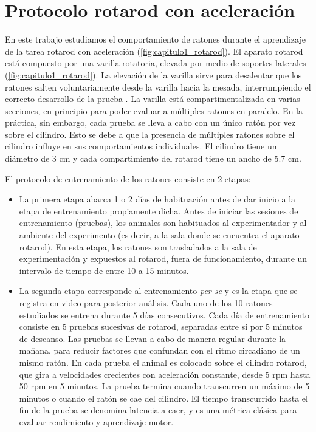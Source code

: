 \section{Protocolo rotarod con aceleración}\label{sec:protocolo}

En este trabajo estudiamos el comportamiento de ratones durante el aprendizaje de la tarea rotarod con aceleración (\autoref{fig:capitulo1_rotarod}). El aparato rotarod está compuesto por una varilla rotatoria, elevada por medio de soportes laterales (\autoref{fig:capitulo1_rotarod}). La elevación de la varilla sirve para desalentar que los ratones salten voluntariamente desde la varilla hacia la mesada, interrumpiendo el correcto desarrollo de la prueba \cite{mouse_tests}. La varilla está compartimentalizada en varias secciones, en principio para poder evaluar a múltiples ratones en paralelo. En la práctica, sin embargo, cada prueba se lleva a cabo con un único ratón por vez sobre el cilindro. Esto se debe a que la presencia de múltiples ratones sobre el cilindro influye en sus comportamientos individuales. El cilindro tiene un diámetro de 3 cm y cada compartimiento del rotarod tiene un ancho de 5.7 cm.

El protocolo de entrenamiento de los ratones consiste en 2 etapas:
\begin{itemize}
    \item La primera etapa abarca 1 o 2 días de habituación antes de dar inicio a la etapa de entrenamiento propiamente dicha. Antes de iniciar las sesiones de entrenamiento (pruebas), los animales son habituados al experimentador y al ambiente del experimento (es decir, a la sala donde se encuentra el aparato rotarod). En esta etapa, los ratones son trasladados a la sala de experimentación y expuestos al rotarod, fuera de funcionamiento, durante un intervalo de tiempo de entre 10 a 15 minutos.

    \item La segunda etapa corresponde al entrenamiento \textit{per se} y es la etapa que se registra en video para posterior análisis. Cada uno de los 10 ratones estudiados se entrena durante 5 días consecutivos. Cada día de entrenamiento consiste en 5 pruebas sucesivas de rotarod, separadas entre sí por 5 minutos de descanso. Las pruebas se llevan a cabo de manera regular durante la mañana, para reducir factores que confundan con el ritmo circadiano de un mismo ratón. En cada prueba el animal es colocado sobre el cilindro rotarod, que gira a velocidades crecientes con aceleración constante, desde 5 rpm hasta 50 rpm en 5 minutos. La prueba termina cuando transcurren un máximo de 5 minutos o cuando el ratón se cae del cilindro. El tiempo transcurrido hasta el fin de la prueba se denomina latencia a caer, y es una métrica clásica para evaluar rendimiento y aprendizaje motor.
\end{itemize}


